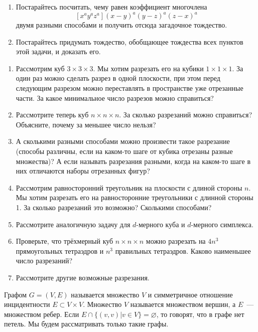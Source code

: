 \begin{enumerate}
\item Постарайтесь посчитать, чему равен коэффициент многочлена
	$$[x^ay^az^a](x-y)^a(y-z)^a(z-x)^a$$
двумя разными способами и получить отсюда загадочное тождество.

\item Постарайтесь придумать тождество, обобщающее тождества всех пунктов этой задачи, и доказать его. 



\end{enumerate}



\begin{enumerate}
\item Рассмотрим куб $3\times 3\times 3$. Мы хотим разрезать его на кубики $1\times 1\times 1$. За один раз можно сделать разрез в одной плоскости, при этом перед следующим разрезом можно переставлять в пространстве уже отрезанные части. За какое минимальное число разрезов можно справиться?
\item Рассмотрите теперь куб $n\times n\times n$. За сколько разрезаний можно справиться? Объясните, почему за меньшее число нельзя?
\item А сколькими разными способами можно произвести такое разрезание (способы различны, если на каком-то шаге от кубика отрезаны разные множества)? А если называть разрезания разными, когда на каком-то шаге в них отличаются наборы отрезанных фигур?
\item Рассмотрим равносторонний треугольник на плоскости с длиной стороны $n$. Мы хотим разрезать его на равносторонние треугольники с длинной стороны 1. За сколько разрезаний это возможно? Сколькими способами?
\item Рассмотрите аналогичную задачу для $d$-мерного куба и $d$-мерного симплекса.
\item Проверьте, что трёхмерный куб $n\times n \times n$ можно разрезать на $4n^3$ прямоугольных тетраэдров и $n^3$ правильных тетраэдров. Каково наименьшее число разрезаний?
\item Рассмотрите другие возможные разрезания. 
\end{enumerate}



 Графом $G = (V,E)$ называется множество $V$ и симметричное отношение инцидентности $E\subset V\times V$. Множество $V$ называется множеством вершин, а $E$~— множеством ребер. Если $E\cap \{(v,v)|v\in V\} = \varnothing$, то говорят, что в графе нет петель. Мы будем рассматривать только такие графы.

